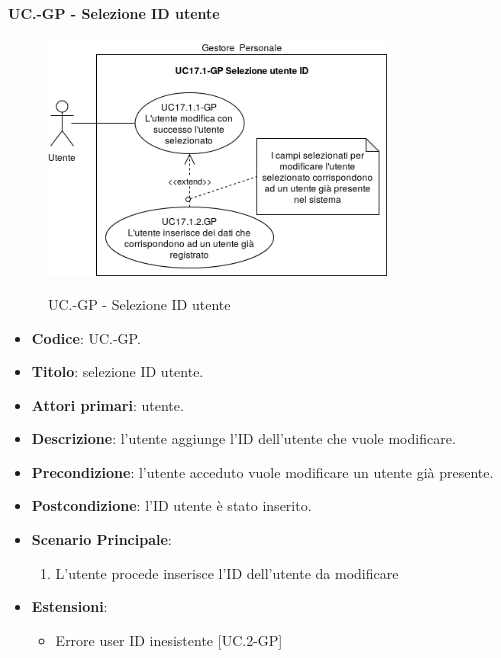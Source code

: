 	\paragraph{UC\theuccount.\thesubuccount-GP - Selezione ID utente}
		\begin{figure}[H]
			\centering
			\includegraphics[width=0.8\textwidth]{img/casi_d'uso/UC17_1.png}\\
			\caption{UC\theuccount.\thesubuccount-GP - Selezione ID utente}
		\end{figure}
		\begin{itemize}
			\item \textbf{Codice}: UC\theuccount.\thesubuccount-GP.
			\item \textbf{Titolo}: selezione ID utente.
			\item \textbf{Attori primari}: utente.
			\item \textbf{Descrizione}: l'utente aggiunge l'ID dell'utente che vuole modificare.
			\item \textbf{Precondizione}: l'utente acceduto vuole modificare un utente già presente.
			\item \textbf{Postcondizione}: l'ID utente è stato inserito.
			\item \textbf{Scenario Principale}:
			\begin{enumerate}
				\item L'utente procede inserisce l'ID dell'utente da modificare
			\end{enumerate}
			\item \textbf{Estensioni}:
			\begin{itemize}
				\item Errore user ID inesistente [UC\theuccount.2-GP]
			\end{itemize}
		\end{itemize}
		
